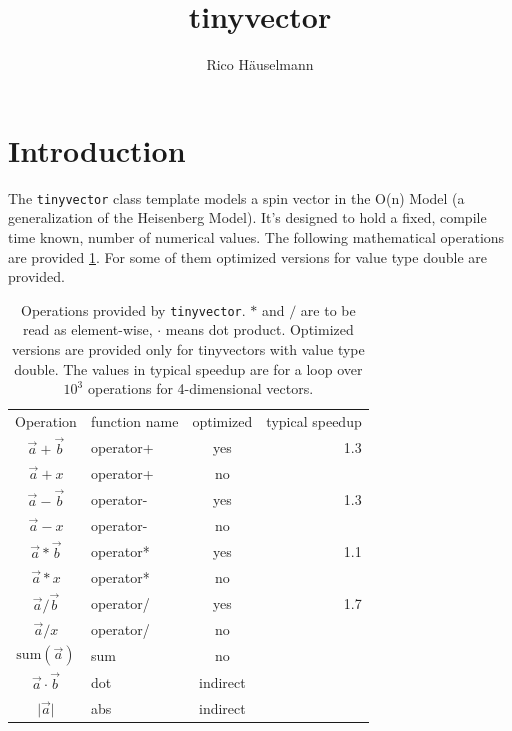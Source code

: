 \documentclass[a4paper]{scrartcl}
\author{Rico H\"auselmann}
\title{tinyvector}
\newcommand{\vec}[1]{\overrightarrow{#1}}
\begin{document}
\maketitle
\section*{Introduction}
The \texttt{tinyvector} class template models a spin vector in the O(n) Model (a generalization of the Heisenberg Model). It's designed to hold a fixed, compile time known, number of numerical values.
The following mathematical operations are provided \cref{table:ops}. For some of them optimized versions for value type double are provided.

\begin{table}[h]
    \begin{tabular}{c l c r}
        Operation & function name & optimized & typical speedup\\
        $\vec{a} + \vec{b}$     & operator+ & yes & 1.3 \\
        $\vec{a} + x$           & operator+ & no & \\
        $\vec{a} - \vec{b}$     & operator- & yes & 1.3 \\
        $\vec{a} - x$           & operator- & no & \\
        $\vec{a} * \vec{b}$     & operator* & yes & 1.1 \\
        $\vec{a} * x$           & operator* & no & \\
        $\vec{a} / \vec{b}$     & operator/ & yes & 1.7 \\
        $\vec{a} / x$           & operator/ & no & \\
        $\text{sum}(\vec{a})$   & sum       & no & \\
        $\vec{a} \cdot \vec{b}$ & dot       & indirect & \\
        $\lvert\vec{a}\rvert$   & abs       & indirect & \\
    \end{tabular} 
    \caption{\label{table:ops}Operations provided by \texttt{tinyvector}. $*$ and $/$ are to be read as element-wise, $\cdot$ means dot product. Optimized versions are provided only for tinyvectors with value type double. The values in typical speedup are for a loop over $10^3$ operations for 4-dimensional vectors.}
\end{table}
\end{document}
